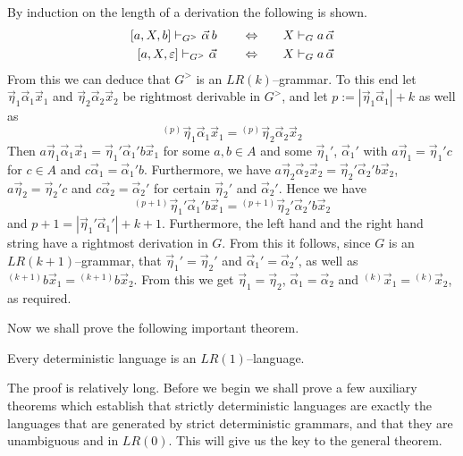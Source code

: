 By induction on the length of a derivation the following is
shown.
\begin{subequations}
\begin{align}
[a, X, b] \vdash_{G^>} \vec{\alpha}\, b \qquad\Leftrightarrow\qquad
& X \vdash_G a \, \vec{\alpha} \\
[a, X, \varepsilon] \vdash_{G^>} \vec{\alpha} \qquad\Leftrightarrow\qquad
& X \vdash_G a\, \vec{\alpha}
\end{align}
\end{subequations}
From this we can deduce that $G^>$ is an $LR(k)$--grammar. To
this end let $\vec{\eta}_1 \vec{\alpha}_1 \vec{x}_1$ and
$\vec{\eta}_2 \vec{\alpha}_2 \vec{x}_2$ be rightmost derivable
in $G^>$, and let $p := |\vec{\eta}_1 \vec{\alpha}_1| +k$ as
well as
\begin{equation}
{^{(p)}\vec{\eta}_1 \vec{\alpha}_1 \vec{x}_1} =
{^{(p)}\vec{\eta}_2 \vec{\alpha}_2 \vec{x}_2}
\end{equation}
Then $a\vec{\eta}_1 \vec{\alpha}_1 \vec{x}_1 =
\vec{\eta}_1' \vec{\alpha}_1' b \vec{x}_1$ for some $a, b \in A$
and some $\vec{\eta}_1'$, $\vec{\alpha}_1'$ with
$a \vec{\eta}_1 = \vec{\eta}_1' c$ for $c \in A$
and $c \vec{\alpha}_1 = \vec{\alpha}_1' b$. Furthermore,
we have $a\vec{\eta}_2 \vec{\alpha}_2 \vec{x}_2 =
\vec{\eta}_2' \vec{\alpha}_2' b \vec{x}_2$,
$a \vec{\eta}_2 = \vec{\eta}_2' c$ and $c \vec{\alpha}_2 =
\vec{\alpha}_2'$ for certain $\vec{\eta}_2'$ and
$\vec{\alpha}_2'$. Hence we have
\begin{equation}
{^{(p+1)}\vec{\eta}_1' \vec{\alpha}_1' b \vec{x}_1} =
{^{(p+1)}\vec{\eta}_2' \vec{\alpha}_2' b \vec{x}_2}
\end{equation}
and $p +1 = |\vec{\eta}_1' \vec{\alpha}_1'| + k + 1$.
Furthermore, the left hand and the right hand string
have a rightmost derivation in $G$. From this it follows,
since $G$ is an $LR(k+1)$--grammar, that $\vec{\eta}_1' = %
\vec{\eta}_2'$ and $\vec{\alpha}_1' = \vec{\alpha}_2'$,
as well as ${^{(k+1)}b \vec{x}_1} = {^{(k+1)}b \vec{x}_2}$.
From this we get $\vec{\eta}_1 = \vec{\eta}_2$, $\vec{\alpha}_1 %
= \vec{\alpha}_2$ and ${^{(k)}\vec{x}_1} = {^{(k)}\vec{x}_2}$,
as required.
\proofend

Now we shall prove the following important theorem.
\begin{thm}
\label{thm:detlr1}
Every deterministic language is an $LR(1)$--lan\-gua\-ge.
\end{thm}
The proof is relatively long. Before we begin we shall
prove a few auxiliary theorems which establish that strictly
deterministic languages are exactly the languages that are
generated by strict deterministic grammars, and that they
are unambiguous and in $LR(0)$. This will give us the key
to the general theorem.

